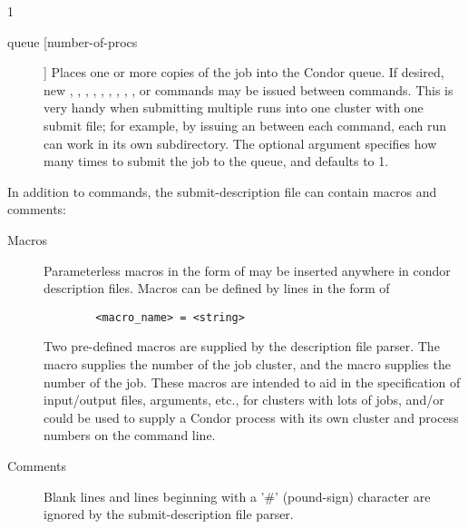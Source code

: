\begin{ManPage}{\label{man-condor-submit}}{1}
\begin{description}

\item[queue [number-of-procs] ] Places one or more copies of the job into
the Condor queue. If desired, new , ,
, , , ,
, , , or 
commands may be issued between  commands. This is very handy
when submitting multiple runs into one cluster with one submit file; for
example, by issuing an  between each 
command, each run can work in its own subdirectory. The optional
argument  specifies how many times to submit the
job to the queue, and defaults to 1.

\end{description}

In addition to commands, the submit-description file can contain macros
and comments:

\begin{description}

\item[Macros] Parameterless macros in the form of 
may be inserted anywhere in condor description files. Macros can be
defined by lines in the form of 
\begin{verbatim} 
        <macro_name> = <string> 
\end{verbatim} 
Two pre-defined macros are supplied by the description file parser. The
 macro supplies the number of the job cluster, and the
 macro supplies the number of the job. These macros are
intended to aid in the specification of input/output files, arguments,
etc., for clusters with lots of jobs, and/or could be used to supply a
Condor process with its own cluster and process numbers on the command
line. 

\item[Comments] Blank lines and lines beginning with a '\#' (pound-sign)
character are ignored by the submit-description file parser. 

\end{description}


\begin{Options}




\end{Options}
\end{ManPage}
